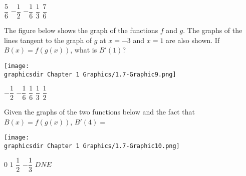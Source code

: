 \begin{questions}
    \begin{oneparchoices}
        \choice $\dfrac{5}{6}$
        \choice $-\dfrac{1}{2}$
        \choice $-\dfrac{1}{6}$
        \choice $\dfrac{1}{3}$
        \choice $\dfrac{7}{6}$
    \end{oneparchoices} \par \horizontalline

    \question The figure below shows the graph of the functions $f$ and $g$. The graphs of the lines tangent to the graph of $g$ at $x = -3$ and $x = 1$ are also shown. If $B(x) = f(g(x))$, what is $B'(1)$?
    \begin{center}
        \texttt{[image: \\graphicsdir Chapter 1 Graphics/1.7-Graphic9.png]}
    \end{center} \vspace{11pt}

    \begin{oneparchoices}
        \choice $-\dfrac{1}{2}$
        \choice $-\dfrac{1}{6}$
        \choice $\dfrac{1}{6}$
        \choice $\dfrac{1}{3}$
        \choice $\dfrac{1}{2}$
    \end{oneparchoices} \par \horizontalline

    \question Given the graphs of the two functions below and the fact that $B(x) = f(g(x))$, $B'(4) =$ 
    \begin{center}
        \texttt{[image: \\graphicsdir Chapter 1 Graphics/1.7-Graphic10.png]}
    \end{center} \vspace{11pt}

    \begin{oneparchoices}
        \choice $0$
        \choice $1$
        \choice $\dfrac{1}{2}$
        \choice $-\dfrac{1}{3}$
        \choice $DNE$
    \end{oneparchoices} \par \horizontalline
\end{questions} 